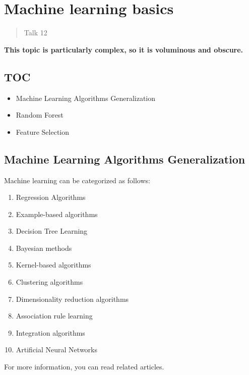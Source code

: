 \documentclass[
]{article}
\begin{document}
\hypertarget{machine-learning-basics}{%
\section{Machine learning basics}\label{machine-learning-basics}}

\begin{quote}
Talk 12
\end{quote}

\textbf{This topic is particularly complex, so it is voluminous and
obscure.}

\hypertarget{toc-4}{%
\subsection{TOC}\label{toc-4}}

\begin{itemize}
\item
  Machine Learning Algorithms Generalization
\item
  Random Forest
\item
  Feature Selection
\end{itemize}

\hypertarget{machine-learning-algorithms-generalization}{%
\subsection{Machine Learning Algorithms
Generalization}\label{machine-learning-algorithms-generalization}}

Machine learning can be categorized as follows:

\begin{enumerate}
\def\labelenumi{\arabic{enumi}.}
\item
  Regression Algorithms
\item
  Example-based algorithms
\item
  Decision Tree Learning
\item
  Bayesian methods
\item
  Kernel-based algorithms
\item
  Clustering algorithms
\item
  Dimensionality reduction algorithms
\item
  Association rule learning
\item
  Integration algorithms
\item
  Artificial Neural Networks
\end{enumerate}

For more information, you can read related articles.
\end{document}
